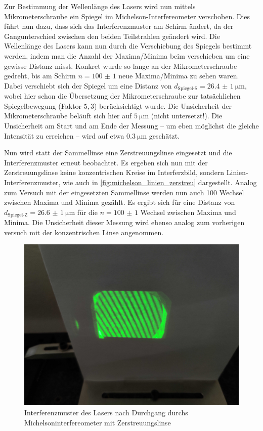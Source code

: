 \documentclass[ngerman]{scrartcl}
\begin{document}
Zur Bestimmung der Wellenlänge des Lasers wird nun mittels Mikrometerschraube ein Spiegel im Michelson-Interfereometer verschoben. Dies führt nun dazu, dass sich das Interferenzmuster am Schirm ändert, da der Gangunterschied zwischen den beiden Teilstrahlen geändert wird. Die Wellenlänge des Lasers kann nun durch die Verschiebung des Spiegels bestimmt werden, indem man die Anzahl der Maxima/Minima beim verschieben um eine gewisse Distanz misst. Konkret wurde so lange an der Mikrometerschraube gedreht, bis am Schirm $n = \num{100(1)}$ neue Maxima/Minima zu sehen waren. Dabei verschiebt sich der Spiegel um eine Distanz von $d_\text{Spiegel-S} = \SI{26.4(10)}{\micro\meter}$, wobei hier schon die Übersetzung der Mikrometerschraube zur tatsächlichen Spiegelbewegung (Faktor $5,3$) berücksichtigt wurde. Die Unsicherheit der Mikrometerschraube beläuft sich hier auf $\SI{5}{\micro\meter}$ (nicht untersetzt!). Die Unsicherheit am Start und am Ende der Messung -- um eben möglichst die gleiche Intensität zu erreichen -- wird auf etwa $\SI{0.3}{\micro\meter}$ geschätzt.

Nun wird statt der Sammellinse eine Zerstreuungslinse eingesetzt und die Interferenzmuster erneut beobachtet. Es ergeben sich nun mit der Zerstreuungslinse keine konzentrischen Kreise im Interferzbild, sondern Linien-Interferenzmuster, wie auch in \autoref{fig:michelson_linien_zerstreu} dargestellt. 
Analog zum Versuch mit der eingesetzten Sammellinse werden nun auch 100 Wechsel zwischen Maxima und Minima gezählt. Es ergibt sich für eine Distanz von $d_\text{Spiegel-Z} = \SI{26.6(10)}{\micro\meter}$ für die $n = \num{100(1)}$ Wechsel zwischen Maxima und Minima. Die Unsicherheit dieser Messung wird ebenso analog zum vorherigen versuch mit der konzentrischen Linse angenommen. 
\begin{figure}[H]
    \centering
    \begin{samepage}
        \includegraphics[width=0.7\linewidth]{fig/Compressed/Zerstreuungslinse.jpg}
        \caption{Interferenzmuster des Lasers nach Durchgang durchs Michelsoninterfereometer mit Zerstreuungslinse}
        \label{fig:michelson_linien_zerstreu}
    \end{samepage}
\end{figure}
\end{document}
